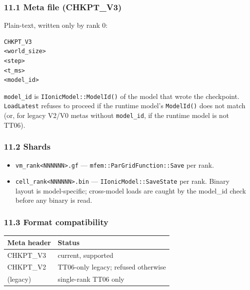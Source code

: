 \documentclass[
  11pt,
]{article}
\providecommand{\tightlist}{%
  \setlength{\itemsep}{0pt}\setlength{\parskip}{0pt}}
\begin{document}
\hypertarget{meta-file-chkpt_v3}{%
\subsubsection{11.1 Meta file (CHKPT\_V3)}\label{meta-file-chkpt_v3}}

Plain-text, written only by rank 0:

\begin{verbatim}
CHKPT_V3
<world_size>
<step>
<t_ms>
<model_id>
\end{verbatim}

\texttt{model\_id} is \texttt{IIonicModel::ModelId()} of the model that
wrote the checkpoint. \texttt{LoadLatest} refuses to proceed if the
runtime model's \texttt{ModelId()} does not match (or, for legacy V2/V0
metas without \texttt{model\_id}, if the runtime model is not TT06).

\hypertarget{shards}{%
\subsubsection{11.2 Shards}\label{shards}}

\begin{itemize}
\tightlist
\item
  \texttt{vm\_rank\textless{}NNNNNN\textgreater{}.gf} ---
  \texttt{mfem::ParGridFunction::Save} per rank.
\item
  \texttt{cell\_rank\textless{}NNNNNN\textgreater{}.bin} ---
  \texttt{IIonicModel::SaveState} per rank. Binary layout is
  model-specific; cross-model loads are caught by the model\_id check
  before any binary is read.
\end{itemize}

\hypertarget{format-compatibility}{%
\subsubsection{11.3 Format compatibility}\label{format-compatibility}}

\begin{longtable}[]{@{}ll@{}}
\toprule\noalign{}
Meta header & Status \\
\midrule\noalign{}
\endhead
\bottomrule\noalign{}
\endlastfoot
CHKPT\_V3 & current, supported \\
CHKPT\_V2 & TT06-only legacy; refused otherwise \\
(legacy) & single-rank TT06 only \\
\end{longtable}
\end{document}

